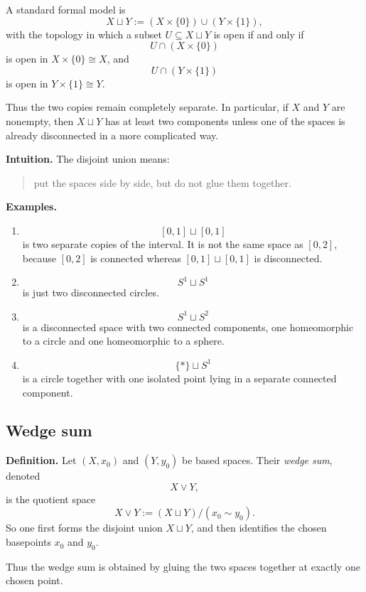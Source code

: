 \documentclass[12pt,a4paper]{article}
\theoremstyle{notespace}
\begin{document}
A standard formal model is
\[
X\sqcup Y := (X\times \{0\})\cup (Y\times \{1\}),
\]
with the topology in which a subset \(U\subseteq X\sqcup Y\) is open if and only if
\[
U\cap (X\times\{0\})
\]
is open in \(X\times\{0\}\cong X\), and
\[
U\cap (Y\times\{1\})
\]
is open in \(Y\times\{1\}\cong Y\).

Thus the two copies remain completely separate. In particular, if \(X\) and \(Y\) are nonempty, then \(X\sqcup Y\) has at least two components unless one of the spaces is already disconnected in a more complicated way.

\medskip

\textbf{Intuition.}
The disjoint union means:
\begin{quote}
	put the spaces side by side, but do not glue them together.
\end{quote}

\medskip

\textbf{Examples.}

\begin{enumerate}
	\item
	\[
	[0,1]\sqcup [0,1]
	\]
	is two separate copies of the interval. It is not the same space as \([0,2]\), because \([0,2]\) is connected whereas \([0,1]\sqcup [0,1]\) is disconnected.
	
	\item
	\[
	S^1\sqcup S^1
	\]
	is just two disconnected circles.
	
	\item
	\[
	S^1\sqcup S^2
	\]
	is a disconnected space with two connected components, one homeomorphic to a circle and one homeomorphic to a sphere.
	
	\item
	\[
	\{*\}\sqcup S^1
	\]
	is a circle together with one isolated point lying in a separate connected component.
\end{enumerate}

\bigskip

\subsection{Wedge sum}

\textbf{Definition.}
Let \((X,x_0)\) and \((Y,y_0)\) be based spaces. Their \emph{wedge sum}, denoted
\[
X\vee Y,
\]
is the quotient space
\[
X\vee Y := (X\sqcup Y)/(x_0\sim y_0).
\]
So one first forms the disjoint union \(X\sqcup Y\), and then identifies the chosen basepoints \(x_0\) and \(y_0\).

Thus the wedge sum is obtained by gluing the two spaces together at exactly one chosen point.
\end{document}
